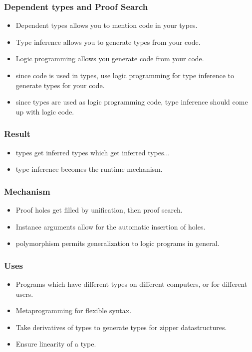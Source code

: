 
\begin{frame}
\frametitle{Dependent types and Proof Search}
\begin{itemize}

\item Dependent types allows you to mention code in your types.
\item Type inference allows you to generate types from your code.
\item Logic programming allows you generate code from your code.
\item since code is used in types, use logic programming for type inference to generate types for your code.
\item since types are used as logic programming code, type inference should come up with logic code.

\end{itemize}
\end{frame}


\begin{frame}
\frametitle{Result}
\begin{itemize}

\item types get inferred types which get inferred types... 
\item type inference becomes the runtime mechanism.

\end{itemize}
\end{frame}


\begin{frame}
\frametitle{Mechanism}
\begin{itemize}

\item Proof holes get filled by unification, then proof search.
\item Instance arguments allow for the automatic insertion of holes.
\item polymorphism permits generalization to logic programs in general.

\end{itemize}
\end{frame}


\begin{frame}
\frametitle{Uses}
\begin{itemize}

\item Programs which have different types on different computers, or for different users.
\item Metaprogramming for flexible syntax.
\item Take derivatives of types to generate types for zipper datastructures.
\item Ensure linearity of a type.

\end{itemize}

\end{frame}


